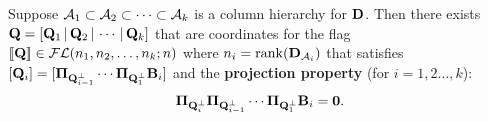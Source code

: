 \begin{prop}\label{prop:stiefel_coords_app}
    Suppose $\mathcal{A}_1 \subset \mathcal{A}_2 \subset \cdots \subset \mathcal{A}_k$ is a column hierarchy for $\mathbf{D}$. Then there exists $\mathbf{Q}= [\mathbf{Q}_1\,|\,\mathbf{Q}_2\,|\, \cdots\,|\,\mathbf{Q}_k]$ that are coordinates for the flag $[\![\mathbf{Q}]\!]\in\mathcal{FL}(n_1,n_2,\dots,n_k;n)$ where $n_i = \mathrm{rank}(\mathbf{D}_{\mathcal{A}_i})$ that satisfies $[\mathbf{Q}_i] = [\boldsymbol{\Pi}_{\mathbf{Q}_{i-1}^\perp}\cdots \boldsymbol{\Pi}_{\mathbf{Q}_1^\perp}\mathbf{B}_i]$ and the \textbf{projection property} (for $i=1,2\dots,k$): 
    \begin{equation}\label{eq:projection_property_app}
    \boldsymbol{\Pi}_{\mathbf{Q}_i^\perp}\boldsymbol{\Pi}_{\mathbf{Q}_{i-1}^\perp}\cdots \boldsymbol{\Pi}_{\mathbf{Q}_1^\perp} \mathbf{B}_i = \bm{0}.
    \end{equation}
\end{prop}
